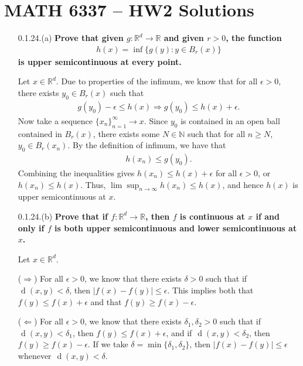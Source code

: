 \documentclass[a4paper,12pt]{article}
\newcommand*\dist{\mathop{\!\mathrm{d}}}
\begin{document}
\section*{MATH 6337 -- HW2 Solutions}
\begin{enumerate}
    \item[0.1.24.(a)]
        \boldmath\textbf{Prove that given $g : \mathbb{R}^d \to \mathbb{R}$ and given $r > 0$, the function
        \begin{align*}
            h(x) = \inf\{ g(y) : y \in B_r(x) \}
        \end{align*}
        is upper semicontinuous at every point.
        }\unboldmath \par
        Let $x \in \mathbb{R}^d$. Due to properties of the infimum, we know that for all $\epsilon > 0$, there exists $y_0 \in B_r(x)$ such that
        \begin{align*}
            g(y_0) - \epsilon \leq h(x) \Rightarrow g(y_0) \leq h(x) + \epsilon.
        \end{align*}
        Now take a sequence $\{x_n\}_{n = 1}^\infty \to x$. Since $y_0$ is contained in an open ball contained in $B_r(x)$, there exists some $N \in \mathbb{N}$ such that for all $n \geq N$, $y_0 \in B_r(x_n)$. By the definition of infimum, we have that
        \begin{align*}
            h(x_n) \leq g(y_0).
        \end{align*}
        Combining the inequalities gives $h(x_n) \leq h(x) + \epsilon$ for all $\epsilon > 0$, or $h(x_n) \leq h(x)$. Thus, $\lim\sup_{n \to \infty} h(x_n) \leq h(x)$, and hence $h(x)$ is upper semicontinuous at $x$.

    \item[0.1.24.(b)]
        \boldmath\textbf{Prove that if $f : \mathbb{R}^d \to \mathbb{R}$, then $f$ is continuous at $x$ if and only if $f$ is both upper semicontinuous and lower semicontinuous at $x$.
        }\unboldmath \par
        Let $x \in \mathbb{R}^d$. \par
        ($\Rightarrow$) For all $\epsilon > 0$, we know that there exists $\delta > 0$ such that if $\dist(x, y) < \delta$, then $|f(x) - f(y)| \leq \epsilon$. This implies both that $f(y) \leq f(x) + \epsilon$ and that $f(y) \geq f(x) - \epsilon$. \par
        ($\Leftarrow$) For all $\epsilon > 0$, we know that there exists $\delta_1, \delta_2 > 0$ such that if $\dist(x, y) < \delta_1$, then $f(y) \leq f(x) + \epsilon$, and if $\dist(x, y) < \delta_2$, then $f(y) \geq f(x) - \epsilon$. If we take $\delta = \min\{ \delta_1, \delta_2 \}$, then $|f(x) - f(y)| \leq \epsilon$ whenever $\dist(x, y) < \delta$.


\end{enumerate}
\end{document}
